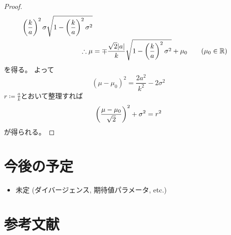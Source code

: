 \documentclass[report]{jlreq}
\begin{document}
\begin{proof}
\begin{alignat}{1}
{                    \left({
                        \frac{k}{a}
                    }\right)^2
                    \sigma
                }{
                    \sqrt{
                        1 - \left({
                            \frac{k}{a}
                        }\right)^2
                        \sigma^2
                    }
                }
                \\
        \therefore \mu
            &=
                \mp \frac{\sqrt{2} |a|}{k}
                \sqrt{
                    1 - \left({
                        \frac{k}{a}
                    }\right)^2
                    \sigma^2
                }
                + \mu_0
                \qquad
                (\mu_0 \in \mathbb{R})
    \end{alignat}
    を得る。
    よって
    \begin{equation}
        (\mu - \mu_0)^2
            =
                \frac{2 a^2}{k^2}
                - 2 \sigma^2
    \end{equation}
    $r \coloneqq \frac{a}{k}$とおいて整理すれば
    \begin{equation}
        \left({
            \frac{\mu - \mu_0}{\sqrt{2}}
        }\right)^2
            + \sigma^2
            = r^2
    \end{equation}
    が得られる。
\end{proof}


%
\section*{今後の予定}

\begin{itemize}
    \item 未定 (ダイバージェンス, 期待値パラメータ, etc.)
\end{itemize}

%
\section*{参考文献}

\nocite{amari_information_2016}

{
    \renewcommand{\bibsection}{}
    
    
}
\end{document}
